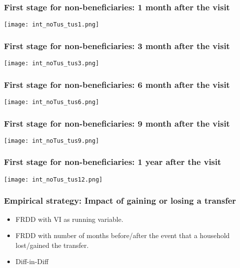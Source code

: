 \documentclass{beamer}
\begin{document}
\begin{frame}
\frametitle{First stage for non-beneficiaries: 1 month after the visit}
\begin{center}
	\texttt{[image: int\_noTus\_tus1.png]}
	\label{int_noTus_tus1}
\end{center}
\end{frame}

\begin{frame}
\frametitle{First stage for non-beneficiaries: 3 month after the visit}
\begin{center}
	\texttt{[image: int\_noTus\_tus3.png]}
	\label{int_noTus_tus3}
\end{center}
\end{frame}

\begin{frame}
\frametitle{First stage for non-beneficiaries: 6 month after the visit}
\begin{center}
	\texttt{[image: int\_noTus\_tus6.png]}
	\label{int_noTus_tus6}
\end{center}
\end{frame}

\begin{frame}
\frametitle{First stage for non-beneficiaries: 9 month after the visit}
\begin{center}
	\texttt{[image: int\_noTus\_tus9.png]}
	\label{int_noTus_tus9}
\end{center}
\end{frame}

\begin{frame}
\frametitle{First stage for non-beneficiaries: 1 year after the visit}
\begin{center}
	\texttt{[image: int\_noTus\_tus12.png]}
	\label{int_noTus_tus12}
\end{center}
\end{frame}

\begin{frame}
\frametitle{Empirical strategy: Impact of gaining or losing a transfer}
\begin{itemize}
	\item FRDD with VI as running variable.
	\item FRDD with number of months before/after the event that a household lost/gained the transfer.
	\item Diff-in-Diff
\end{itemize}
\end{frame}
\end{document}

